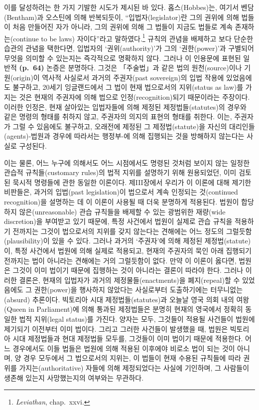 이를 달성하려는 한 가지 기발한 시도가 제시된 바 있다. 홉스(Hobbes)는,
여기서 벤담(Bentham)과 오스틴에 의해 반복되듯이, “입법자(legislator)란
그의 권위에 의해 법들이 처음 만들어진 자가 아니라, 그의 권위에 의해 그
법들이 지금도 법들로 계속 존재하는(continue to be laws) 자이다”라고
말하였다.\footnote{\emph{Leviathan}, chap.~xxvi.} 규칙의 관념을 배제하고
보다 단순한 습관의 관념을 택한다면, 입법자의 ‘권위(authority)’가 그의
‘권한(power)’과 구별되어 무엇을 의미할 수 있는지는 즉각적으로 명확하지
않다. 그러나 이 인용문에 표현된 일반적 \textbf{(p.~64)} 논증은 분명하다.
그것은 「주술법」과 같은 법의 원천(source)이나 기원(origin)이 역사적
사실로서 과거의 주권자(past sovereign)의 입법 작용에 있었음에도
불구하고, 20세기 잉글랜드에서 그 법이 현재 법으로서의 지위(status as
law)를 가지는 것은 현재의 주권자에 의해 법으로 인정(recognition)되기
때문이라는 주장이다. 이러한 인정은, 현재 살아있는 입법자들에 의해 제정된
제정법들(statutes)의 경우와 같은  명령의 형태를
취하지 않고, 주권자의 의지의  표현의 형태를 취한다.
이는, 주권자가 그럴 수 있음에도 불구하고, 오래전에 제정된 그
제정법(statute)을 자신의 대리인들(agents)-법원과 경우에 따라서는
행정부-에 의해 집행되는 것을 방해하지 않는다는 사실로 구성된다.

이는 물론, 어느 누구에 의해서도 어느 시점에서도 명령된 것처럼 보이지
않는 일정한 관습적 규칙들(customary rules)의 법적 지위를 설명하기 위해
원용되었던, 이미 검토된 묵시적 명령들에 관한 동일한 이론이다.
제III장에서 우리가 이 이론에 대해 제기한 비판들은, 과거의 입법(past
legislation)이 법으로서 계속 인정되는 것(continued recognition)을
설명하는 데 이 이론이 사용될 때 더욱 분명하게 적용된다. 법원이 합당하지
않은(unreasonable) 관습 규칙들을 배제할 수 있는 광범위한 재량(wide
discretion)을 부여받고 있기 때문에, 특정 사건에서 법원이 실제로 관습
규칙을 적용하기 전까지는 그것이 법으로서의 지위를 갖지 않는다는 견해에는
어느 정도의 그럴듯함(plausibility)이 있을 수 있다. 그러나 과거의
‘주권자’에 의해 제정된 제정법(statute)이, 특정 사건에서 법원에 의해
실제로 적용되고, 현재의 주권자의 묵인 아래 집행되기 전까지는 법이
아니라는 견해에는 거의 그럴듯함이 없다. 만약 이 이론이 옳다면, 법원은
그것이 이미 법이기 때문에 집행하는 것이 아니라는 결론이 따라야 한다.
그러나 이러한 결론은, 현재의 입법자가 과거의 제정물들(enactments)을
폐지(repeal)할 수 있었음에도 그 권한(power)을 행사하지 않았다는
사실로부터 도출하기에는 터무니없는(absurd) 추론이다. 빅토리아 시대
제정법들(statutes)과 오늘날 영국 의회 내의 여왕(Queen in Parliament)에
의해 통과된 제정법들은 분명히 현재의 영국에서 정확히 동일한 법적
지위(legal status)를 가진다. 양자는 모두, 그것들이 적용될 사건들이
법원에 제기되기 이전부터 이미 법이다. 그리고 그러한 사건들이 발생했을
때, 법원은 빅토리아 시대 제정법들과 현대 제정법들 모두를, 그것들이 이미
법이기 때문에 적용한다. 어느 경우에서도 이들 법들은 법원에 의해 적용된
이후에야 비로소 법이 되는 것이 아니며, 양 경우 모두에서 그 법으로서의
지위는, 이 법들이 현재 수용된 규칙들에 따라 권위를 가지는(authoritative)
자들에 의해 제정되었다는 사실에 기인하며, 그 사람들이 생존해 있는지
사망했는지의 여부와는 무관하다.

